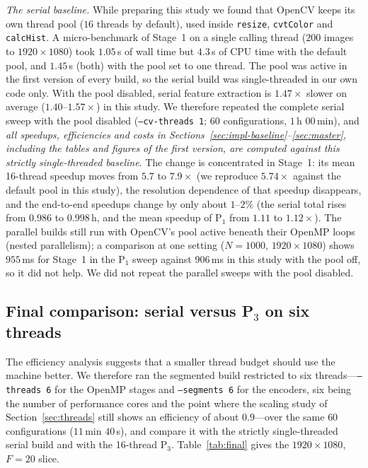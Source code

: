 \documentclass[conference]{IEEEtran}
\begin{document}
\emph{The serial baseline.} While preparing this study we found that OpenCV keeps its own thread pool ($16$ threads by default), used inside \texttt{resize}, \texttt{cvtColor} and \texttt{calcHist}. A micro-benchmark of Stage~1 on a single calling thread ($200$ images to $1920\times1080$) took $1.05$\,s of wall time but $4.3$\,s of CPU time with the default pool, and $1.45$\,s (both) with the pool set to one thread. The pool was active in the first version of every build, so the serial build was single-threaded in our own code only. With the pool disabled, serial feature extraction is $1.47\times$ slower on average ($1.40$--$1.57\times$) in this study. We therefore repeated the complete serial sweep with the pool disabled (\texttt{--cv-threads 1}; $60$ configurations, $1$\,h $00$\,min), and \emph{all speedups, efficiencies and costs in Sections~\ref{sec:impl-baseline}--\ref{sec:master}, including the tables and figures of the first version, are computed against this strictly single-threaded baseline}. The change is concentrated in Stage~1: its mean 16-thread speedup moves from $5.7$ to $7.9\times$ (we reproduce $5.74\times$ against the default pool in this study), the resolution dependence of that speedup disappears, and the end-to-end speedups change by only about $1$--$2\%$ (the serial total rises from $0.986$ to $0.998$\,h, and the mean speedup of P$_1$ from $1.11$ to $1.12\times$). The parallel builds still run with OpenCV's pool active beneath their OpenMP loops (nested parallelism); a comparison at one setting ($N{=}1000$, $1920\times1080$) shows $955$\,ms for Stage~1 in the P$_1$ sweep against $906$\,ms in this study with the pool off, so it did not help. We did not repeat the parallel sweeps with the pool disabled.

\subsection{Final comparison: serial versus P$_3$ on six threads}
\label{sec:final}
The efficiency analysis suggests that a smaller thread budget should use the machine better. We therefore ran the segmented build restricted to six threads---\texttt{--threads 6} for the OpenMP stages and \texttt{--segments 6} for the encoders, six being the number of performance cores and the point where the scaling study of Section~\ref{sec:threads} still shows an efficiency of about $0.9$---over the same $60$ configurations ($11$\,min $40$\,s), and compare it with the strictly single-threaded serial build and with the 16-thread P$_3$. Table~\ref{tab:final} gives the $1920\times1080$, $F{=}20$ slice.
\end{document}
